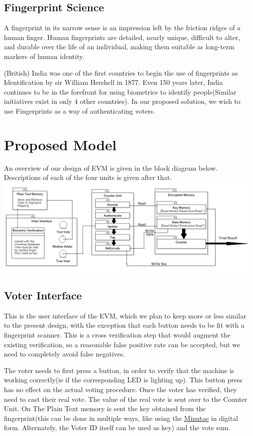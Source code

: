 \documentclass{article}
\begin{document}
\subsection{Fingerprint Science}
A fingerprint in its narrow sense is an impression left by the friction ridges of a human finger. Human fingerprints are detailed, nearly unique, difficult to alter, and durable over the life of an individual, making them suitable as long-term markers of human identity.

(British) India was one of the first countries to begin the use of fingerprints as Identification by sir William Hershell in 1877. Even 150 years later, India continues to be in the forefront for using biometrics to identify people(Similar initiatives exist in only 4 other countries). In our proposed solution, we wish to use Fingerprints as a way of authenticating voters. 
\section{Proposed Model}
An overview of our design of EVM is given in the block diagram below. Descriptions of each of the four units is given after that.  \newline
\includegraphics[width=\textwidth]{EVM_Model}

\subsection{Voter Interface}
This is the user interface of the EVM, which we plan to keep more or less similar to the present design, with the exception that each button needs to be fit with a fingerprint scanner. This is a cross verification step that would augment the existing verification, so a reasonable false positive rate can be accepted, but we need to completely avoid false negatives. 

The voter needs to first press a button, in order to verify that the machine is working correctly(ie if the corresponding LED is lighting up). This button press has no effect on the actual voting procedure. Once the voter has verified, they need to cast their real vote. The value of the real vote is sent over to the Counter Unit. On The Plain Text memory is sent the key obtained from the fingerprint(this can be done in multiple ways, like using the \hyperlink{https://en.wikipedia.org/wiki/Minutiae}{Minutae} in digital form. Alternately, the Voter ID itself can be used as key) and the vote sum.
\end{document}
